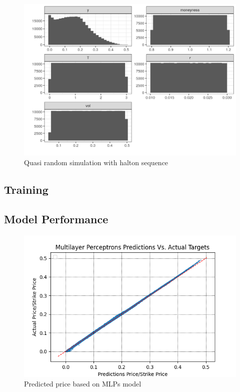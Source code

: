 \begin{figure}[th]
\centering
\includegraphics{Figures/marginalEuroCall.png}
\decoRule
\caption[Marginal distributions for european call]{Quasi random simulation with halton sequence}
\label{fig:marginalEuro}
\end{figure}


\subsection{Training}

\subsection{Model Performance}

\begin{figure}[th]
\centering
\includegraphics{Figures/PredictionEuroC.png}
\decoRule
\caption[MLPs Predictions Vs. Actual Prices]{Predicted price based on MLPs model}
\label{fig:marginalEuro}
\end{figure}

